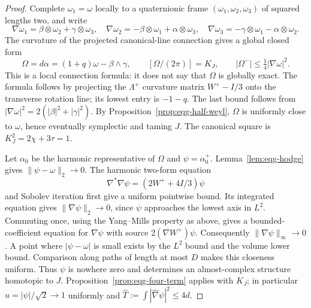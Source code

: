 \begin{proof}
Complete $\omega_1=\omega$ locally to a quaternionic frame
$(\omega_1,\omega_2,\omega_3)$ of squared lengths two, and write
\[
 \nabla\omega_1=\beta\otimes\omega_2+\gamma\otimes\omega_3,
 \quad
 \nabla\omega_2=-\beta\otimes\omega_1+\alpha\otimes\omega_3,
 \quad
 \nabla\omega_3=-\gamma\otimes\omega_1-\alpha\otimes\omega_2.
\]
The curvature of the projected canonical-line connection gives a
global closed form
\begin{equation}\label{eq:eqg-canonical-form}
 \Omega=d\alpha=(1+q)\omega-\beta\wedge\gamma,
 \qquad [\Omega/(2\pi)]=K_J,
 \qquad |\Omega^-|\leq\tfrac14|\nabla\omega|^2.
\end{equation}
This is a local connection formula: it does not say that $\Omega$
is globally exact.  The formula follows by projecting the
$\Lambda^+$ curvature matrix $W^+-I/3$ onto the transverse rotation
line; its lowest entry is $-1-q$.  The last bound follows from
$|\nabla\omega|^2=2(|\beta|^2+|\gamma|^2)$.
By Proposition~\ref{prop:eqg-half-weyl}, $\Omega$ is uniformly close
to $\omega$, hence eventually symplectic and taming $J$.
The canonical square is $K_J^2=2\chi+3\tau=1$.

Let $\alpha_0$ be the harmonic representative of $\Omega$ and
$\psi=\alpha_0^+$.  Lemma~\ref{lem:eqg-hodge} gives
$\|\psi-\omega\|_2\to0$.  The harmonic two-form equation
\[
 \nabla^*\nabla\psi=(2W^++4I/3)\psi
\]
and Sobolev iteration first give a uniform pointwise bound.
Its integrated equation gives $\|\nabla\psi\|_2\to0$,
since $\psi$ approaches the lowest axis in $L^2$.
Commuting once, using the Yang--Mills property as above, gives a
bounded-coefficient equation for $\nabla\psi$ with source
$2(\nabla W^+)\psi$.  Consequently
$\|\nabla\psi\|_\infty\to0$.
A point where $|\psi-\omega|$ is small exists by the $L^2$ bound
and the volume lower bound.  Comparison along paths of length at
most $D$ makes this closeness uniform.  Thus $\psi$ is nowhere zero
and determines an almost-complex structure homotopic to $J$.
Proposition~\ref{prop:eqg-four-term} applies with $K_J$; in particular
$u=|\psi|/\sqrt2\to1$ uniformly and
$\widehat T:=\int|\widehat\nabla\psi|^2\leq4d$.


\end{proof}

